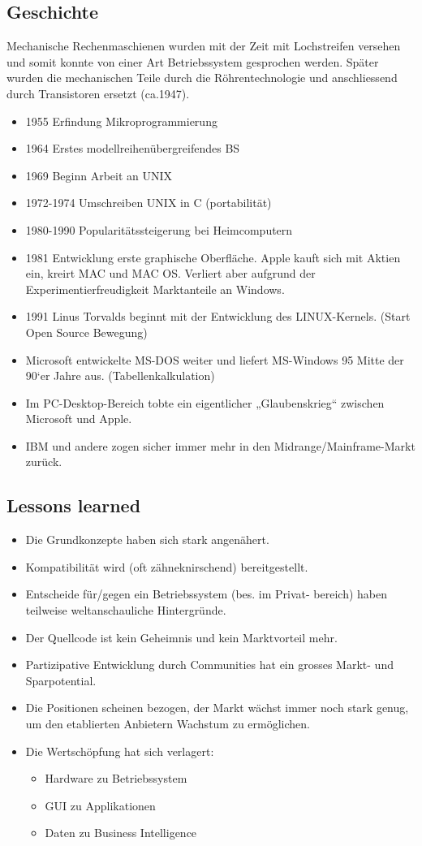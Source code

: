 \documentclass[a4paper, 10pt]{article}
\begin{document}
\subsection{Geschichte}
Mechanische Rechenmaschienen wurden mit der Zeit mit Lochstreifen versehen und somit konnte von einer Art Betriebssystem gesprochen werden. Später wurden die mechanischen Teile durch die Röhrentechnologie und anschliessend durch Transistoren ersetzt (ca.1947).
\begin{itemize}
\item 1955 Erfindung Mikroprogrammierung
\item 1964 Erstes modellreihenübergreifendes BS
\item 1969 Beginn Arbeit an UNIX
\item 1972-1974 Umschreiben UNIX in C (portabilität)
\item 1980-1990 Popularitätssteigerung bei Heimcomputern
\item 1981 Entwicklung erste graphische Oberfläche. Apple kauft sich mit Aktien ein, kreirt MAC und MAC OS. Verliert aber aufgrund der Experimentierfreudigkeit Marktanteile an Windows.
\item 1991 Linus Torvalds beginnt mit der Entwicklung des LINUX-Kernels. (Start Open Source Bewegung)
\item Microsoft entwickelte MS-DOS weiter und liefert MS-Windows
95 Mitte der 90‘er Jahre aus. (Tabellenkalkulation)
\item Im PC-Desktop-Bereich tobte ein eigentlicher „Glaubenskrieg“ zwischen Microsoft und Apple.
\item IBM und andere zogen sicher immer mehr in den Midrange/Mainframe-Markt zurück.
\end{itemize}

\subsection{Lessons learned}
\begin{itemize}


\item Die Grundkonzepte haben sich stark angenähert.
\item Kompatibilität wird (oft zähneknirschend) bereitgestellt.
\item Entscheide für/gegen ein Betriebssystem (bes. im Privat-
bereich) haben teilweise weltanschauliche Hintergründe.
\item Der Quellcode ist kein Geheimnis und kein Marktvorteil mehr.
\item Partizipative Entwicklung durch Communities hat ein grosses
Markt- und Sparpotential.
\item Die Positionen scheinen bezogen, der Markt wächst immer
noch stark genug, um den etablierten Anbietern Wachstum zu
ermöglichen.
\item Die Wertschöpfung hat sich verlagert:
\begin{itemize}
\item Hardware zu Betriebssystem
\item GUI zu Applikationen
\item Daten zu Business Intelligence
\end{itemize}
\end{itemize}
\newpage
\end{document}
